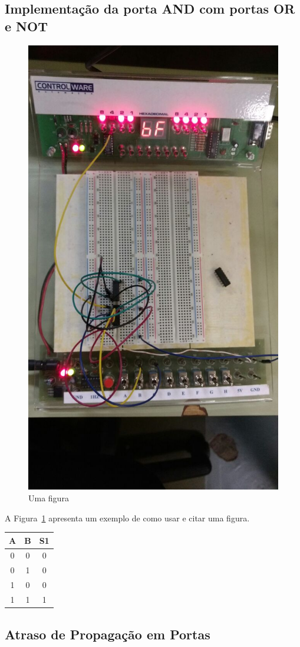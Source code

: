 \documentclass[12pt]{article}
\begin{document}
\subsection{Implementação da porta AND com portas OR e NOT}
\label{sec:NOTOR}

\begin{figure}[H]
\centering
\includegraphics[width=.5\textwidth]{Porta_AND.jpeg}
\caption{Uma figura}
\label{fig:portaand}
\end{figure}

A Figura~\ref{fig:portaand} apresenta um exemplo de como usar e citar uma figura.

\begin{table}[H]
	\centering
	\begin{tabular}{|c|c|c|}
	\cline{1-3}
	\multicolumn{1}{|c|}{A} & \multicolumn{1}{|c|}{B} & \multicolumn{1}{|c|}{S1}\\
	\hline
	0 & 0 & 0\\
	0 & 1 & 0\\
	1 & 0 & 0\\
	1 & 1 & 1\\
	\hline
	\end{tabular}
	\label{ORNOTAND}
\end{table}

\subsection{Atraso de Propagação em Portas}
\label{sec:atraso}
\end{document}
